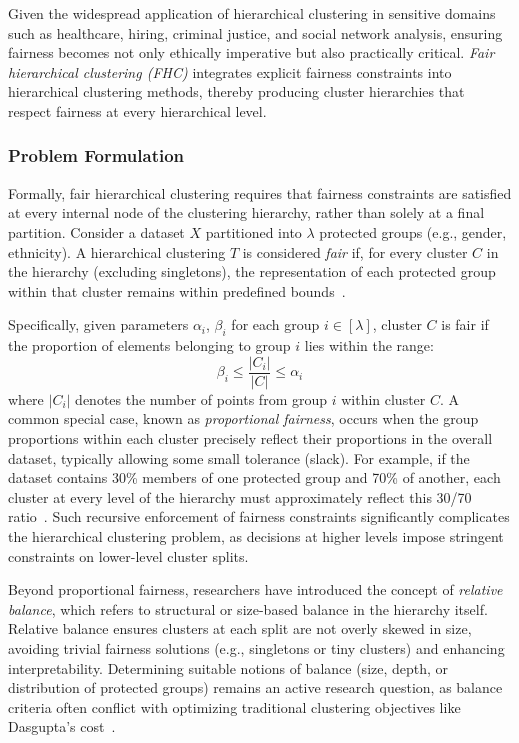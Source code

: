 
Given the widespread application of hierarchical clustering in sensitive domains such as healthcare, hiring, criminal justice, and social network analysis, ensuring fairness becomes not only ethically imperative but also practically critical. \emph{Fair hierarchical clustering (FHC)} integrates explicit fairness constraints into hierarchical clustering methods, thereby producing cluster hierarchies that respect fairness at every hierarchical level.

\subsubsection{Problem Formulation}

Formally, fair hierarchical clustering requires that fairness constraints are satisfied at every internal node of the clustering hierarchy, rather than solely at a final partition. Consider a dataset \( X \) partitioned into \( \lambda \) protected groups (e.g., gender, ethnicity). A hierarchical clustering \( T \) is considered \emph{fair} if, for every cluster \( C \) in the hierarchy (excluding singletons), the representation of each protected group within that cluster remains within predefined bounds~\cite{knittel2023generalized}. 

Specifically, given parameters \(\alpha_i\), \(\beta_i\) for each group \( i \in [\lambda] \), cluster \( C \) is fair if the proportion of elements belonging to group \( i \) lies within the range:
\[
\beta_i \leq \frac{|C_i|}{|C|} \leq \alpha_i
\]
where \(|C_i|\) denotes the number of points from group \( i \) within cluster \( C \). A common special case, known as \emph{proportional fairness}, occurs when the group proportions within each cluster precisely reflect their proportions in the overall dataset, typically allowing some small tolerance (slack). For example, if the dataset contains 30\% members of one protected group and 70\% of another, each cluster at every level of the hierarchy must approximately reflect this 30/70 ratio~\cite{knittel2023generalized}. Such recursive enforcement of fairness constraints significantly complicates the hierarchical clustering problem, as decisions at higher levels impose stringent constraints on lower-level cluster splits.

Beyond proportional fairness, researchers have introduced the concept of \emph{relative balance}, which refers to structural or size-based balance in the hierarchy itself. Relative balance ensures clusters at each split are not overly skewed in size, avoiding trivial fairness solutions (e.g., singletons or tiny clusters) and enhancing interpretability. Determining suitable notions of balance (size, depth, or distribution of protected groups) remains an active research question, as balance criteria often conflict with optimizing traditional clustering objectives like Dasgupta’s cost~\cite{knittel2023generalized}.


